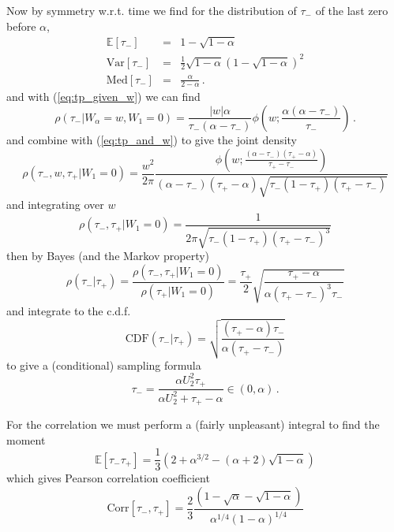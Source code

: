\documentclass{article}
\newcommand{\tm}{{\tau_{\mathrm{-}}}}
\newcommand{\tp}{{\tau_{\mathrm{+}}}}
\newcommand{\Var}{\mathrm{Var}}
\newcommand{\Med}{\mathrm{Med}}
\begin{document}
Now by symmetry w.r.t. time we find for the distribution of $\tm$ of the last zero before $\alpha$,
\begin{eqnarray}
\mathbb{E}\left[\tm\right] &=& 1-\sqrt{1-\alpha} \\
\Var\left[\tm\right] &=& \frac{1}{2}\sqrt{1-\alpha}\left(1-\sqrt{1-\alpha}\right)^2 \\
\Med\left[\tm\right] &=&  \frac{\alpha}{2-\alpha} \, .
\end{eqnarray}
and with (\ref{eq:tp_given_w}) we can find 
\begin{equation}
  \rho\left(\tm | W_\alpha=w,W_1=0\right) =  \frac{|w|\alpha}{\tm(\alpha-\tm)}\phi\left(w;\frac{\alpha(\alpha-\tm)}\tm\right) \label{eq:tm_given_w} \,.
\end{equation}
and combine with (\ref{eq:tp_and_w}) to give the joint density
\begin{equation}\label{eq:lwf}
\rho(\tm,w,\tp |W_1=0) = \frac{w^2}{2\pi} \frac{\phi\left(w;\frac{(\alpha-\tm)(\tp-\alpha)}{\tp-\tm}\right)}{(\alpha-\tm)(\tp-\alpha)\sqrt{\tm(1-\tp)(\tp-\tm)}} 
\end{equation}
and integrating over $w$
\begin{equation}\label{eq:tm_and_tp}
\rho(\tm,\tp|W_1=0) = \frac{1}{2\pi \sqrt{\tm(1-\tp)(\tp-\tm)^3}}
\end{equation}
then by Bayes (and the Markov property)
\begin{equation}
\rho(\tm|\tp) = \frac{\rho(\tm,\tp|W_1=0)}{\rho(\tp|W_1=0)} = \frac{\tp}{2} \sqrt{\frac{\tp-\alpha}{\alpha(\tp-\tm)^3\tm}}
\end{equation}
and integrate to the c.d.f.
\begin{equation}
  \textrm{CDF}(\tm|\tp) = \sqrt{\frac{(\tp-\alpha)\tm}{\alpha(\tp-\tm)}}
\end{equation}
to give a (conditional) sampling formula
\begin{equation}\label{eq:tm_sample}
\tm =  \frac{\alpha U_2^2 \tp}{\alpha U_2^2 + \tp - \alpha} \in \left(0,\alpha\right) \, .
\end{equation}

For the correlation we must perform a (fairly unpleasant) integral to find the moment
\begin{equation}\label{eq:tptm}
 \mathbb{E} \left[\tm\tp\right] =  \frac{1}{3} \left(2 + \alpha^{3/2} - \left(\alpha+2\right)\sqrt{1-\alpha}\right)
\end{equation}
which gives Pearson correlation coefficient
\begin{equation}\label{eq:corr}
 \mathrm{Corr} \left[\tm,\tp\right] =  \frac{2}{3} \frac{\left(1-\sqrt{\alpha}-\sqrt{1-\alpha}\right)}{\alpha^{1/4}\left(1-\alpha\right)^{1/4}}
\end{equation}
\end{document}
